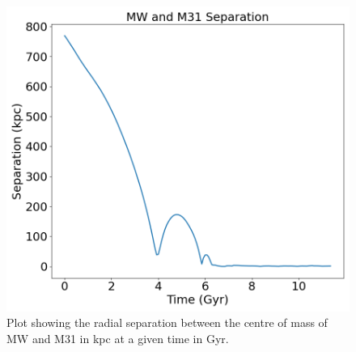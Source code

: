 \documentclass[linenumbers,trackchanges]{aastex7}
\begin{document}
\begin{figure}[h!]
\centering
\includegraphics[scale=0.35]{MWM31RS.png}
\caption{Plot showing the radial separation between the centre of mass of MW and M31 in kpc at a given time in Gyr.
\label{fig:general}}
\end{figure}
\end{document}
